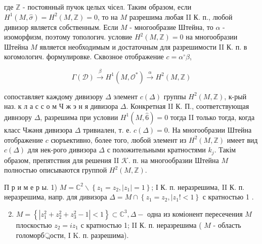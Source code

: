 \documentclass[10pt]{article}
\begin{document}
где $\mathbb{Z}$ - постоянный пучок целых чісел. Таким образом, если $H^{1}(M, \widehat{\sigma})=H^{2}(M, \mathbb{Z})=0$, то на $M$ разрешима любая II К. п., любой дивизор является собственным. Если $M$ - многообразие Штейна, то $\alpha$ - изоморфизм, поэтому топологич. условие $H^{2}(M, \mathbb{Z})=0$ на многообразии Штейна $M$ является необходимым и достаточным для разрешимости II К. п. в когомологич. формулировке. Сквозное отображение $c=\alpha^{\circ} \beta$,



\[

\Gamma(\mathscr{D}) \stackrel{\beta}{\longrightarrow} H^{1}\left(M, \mathscr{O}^{*}\right) \stackrel{\alpha}{\longrightarrow} H^{2}(M, \mathbb{Z})

\]



сопоставляет каждому дивизору $\Delta$ элемент $c(\Delta)$ группы $H^{2}(M, \mathbb{Z})$, к-рый наз. к л а с с о м Ч ж э н я дивизора $\Delta$. Конкретная II К. П., соответствующая дивнзору $\Delta$, разрешима при условии $H^{1}(M, \widehat{6})=0$ тогда II только тогда, когда класс Чжәня дивизора $\Delta$ тривиален, т. е. $c(\Delta)=0$. На многообразии Штейна отображение $c$ сюръективно, более того, любой элемент из $H^{2}(M, \mathbb{Z})$ имеет вид $c(\Delta)$ для нек-рого дивизора $\Delta$ с положительными кратностями $k_{j}$. Такім образом, препятствия для решения II $\mathcal{K}$. п. на многообразии Штейна $M$ полностью описываются группой $H^{2}(M, \mathbb{Z})$.



П р и м е р ы. 1) $M=\mathbb{C}^{2} \backslash\left\{z_{1}=z_{2},\left|z_{1}\right|=1\right\}$; І К. п. неразрешима, II К. п. неразрешима, напр. для дивизора $\Delta=M \cap\left\{z_{1}=z_{2}, \mid z_{1} !<1\right\}$ с кратностью 1 .



\begin{enumerate}

  \setcounter{enumi}{1}

  \item $M=\left\{\left|z_{1}^{2}+z_{2}^{2}+z_{3}^{2}-1\right|<1\right\} \subset \mathbb{C}^{3}, \Delta-$ одна из коміонент пересечения $M$ плоскостью $z_{2}=i z_{1}$ с кратностью 1; II К. п. неразрешима ( $M$ - область голоморб্রости, I K. п. разрешима).

\end{enumerate}
\end{document}
